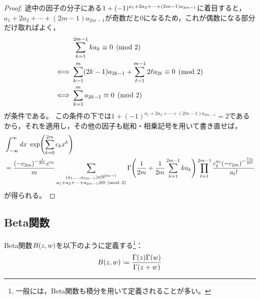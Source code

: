 \documentclass[a4paper,draft]{ltjsarticle}
\begin{document}
\begin{prop}[Gauss積分の一般化 その2]
\begin{proof}
        途中の因子の分子にある$1+(-1)^{a_1+2a_2+\cdots+\pare{2m-1}a_{2m-1}}$に着目すると，$a_1+2a_2+\cdots+(2m-1)a_{2m-1}$が奇数だと$0$になるため，これが偶数になる部分だけ取ればよく，
        \begin{align}
            &\sum_{k=1}^{2m-1} ka_k \equiv 0 \pmod{2}
            \\
            \Longleftrightarrow\ 
            &\sum_{k=1}^m \pare{2k-1}a_{2k-1}+\sum_{\ell=1}^{m-1}2\ell a_{2\ell}\equiv 0 \pmod{2}
            \\
            \Longleftrightarrow\ 
            &\sum_{k=1}^{m} a_{2k-1}\equiv 0 \pmod{2}
        \end{align}
        が条件である。
        この条件の下では$1+(-1)^{a_1+2a_2+\cdots+(2m-1)a_{2m-1}}=2$であるから，それを適用し，その他の因子も総和・相乗記号を用いて書き直せば，
        \begin{align}
            &\int_{-\infty}^\infty dx\ \fun{\exp}{\sum_{k=0}^{2m} c_k x^k}
            \\
            &=\frac{\pare{-c_{2m}}^{-\frac{1}{2m}}e^{c_0}}{m}\sum_{
                \substack{
                    \pare{a_1,\dots, a_{2m-1}}\in \N^{2m-1}
                    \\
                    a_1+a_3+\cdots+a_{2m-1}\equiv 0\ \pare{\mathrm{mod}.\, 2}
                }
            }
            \fun{\Gamma}{\frac{1}{2m}+\frac{1}{2m}\sum_{k=1}^{2m-1}k a_k}
            \prod_{\ell = 1}^{2m-1}\frac{c_\ell^{a_\ell} \pare{-c_{2m}}^{-\frac{\ell a_\ell}{2m}}}{a_\ell !}
        \end{align}
        が得られる。
    \end{proof}
\end{prop}






\subsection{Beta関数}
\begin{defi}[Beta関数]
    Beta関数$\fun{B}{z,w}$を以下のように定義する\footnote{一般には，Beta関数も積分を用いて定義されることが多い。}：
    \begin{equation}
        \fun{B}{z,w}\coloneqq\dfrac{\fun{\Gamma}{z}\fun{\Gamma}{w}}{\fun{\Gamma}{z+w}}
    \end{equation}
\end{defi}

\begin{comment}
    後のために$\fun{B}{z,1}$の値を求めておくと，
    \begin{equation}
        \fun{B}{z,1}=\dfrac{\fun{\Gamma}{z}\fun{\Gamma}{1}}{\fun{\Gamma}{z+1}}=\dfrac{\fun{\Gamma}{z}\cdot 1}{z\fun{\Gamma}{z}}=\dfrac{1}{z}
    \end{equation}
    となる。
\end{comment}
\end{document}
